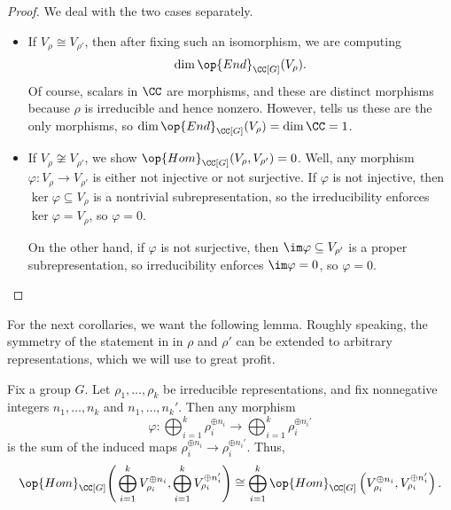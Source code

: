 \documentclass{article}
\begin{document}
\begin{proof}
	We deal with the two cases separately.
	\begin{itemize}
		\item If $V_\rho\cong V_{\rho'}$, then after fixing such an isomorphism, we are computing
		\[\dim\op{End}_{\CC[G]}(V_\rho).\]
		Of course, scalars in $\CC$ are morphisms, and these are distinct morphisms because $\rho$ is irreducible and hence nonzero. However,  tells us these are the only morphisms, so $\dim\op{End}_{\CC[G]}(V_\rho)=\dim\CC=1$.
		\item If $V_\rho\not\cong V_{\rho'}$, we show $\op{Hom}_{\CC[G]}(V_\rho,V_{\rho'})=0$. Well, any morphism $\varphi\colon V_\rho\to V_{\rho'}$ is either not injective or not surjective. If $\varphi$ is not injective, then $\ker\varphi\subseteq V_\rho$ is a nontrivial subrepresentation, so the irreducibility enforces $\ker\varphi=V_\rho$, so $\varphi=0$.
		
		On the other hand, if $\varphi$ is not surjective, then $\im\varphi\subseteq V_{\rho'}$ is a proper subrepresentation, so irreducibility enforces $\im\varphi=0$, so $\varphi=0$.
		\qedhere
	\end{itemize}
\end{proof}
For the next corollaries, we want the following lemma. Roughly speaking, the symmetry of the statement in  in $\rho$ and $\rho'$ can be extended to arbitrary representations, which we will use to great profit.
\begin{lemma} \label{lem:isotypical-morphisms}
	Fix a group $G$. Let $\rho_1,\ldots,\rho_k$ be irreducible representations, and fix nonnegative integers $n_1,\ldots,n_k$ and $n_1,\ldots,n_k'$. Then any morphism
	\[\varphi\colon\bigoplus_{i=1}^k\rho_i^{\oplus n_i}\to\bigoplus_{i=1}^k\rho_i^{\oplus n_i'}\]
	is the sum of the induced maps $\rho_i^{\oplus n_i}\to\rho_i^{\oplus n_i'}$. Thus,
	\[\op{Hom}_{\CC[G]}\Bigg(\bigoplus_{i=1}^kV_{\rho_i}^{\oplus n_i},\bigoplus_{i=1}^kV_{\rho_i}^{\oplus n_i'}\Bigg)\cong\bigoplus_{i=1}^k\op{Hom}_{\CC[G]}\left(V_{\rho_i}^{\oplus n_i},V_{\rho_i}^{\oplus n_i'}\right).\]
\end{lemma}
\end{document}
